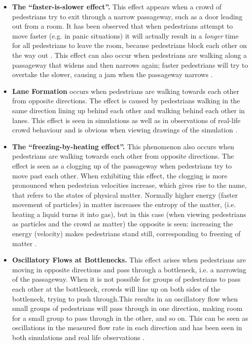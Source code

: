 \begin{itemize}
    \item \textbf{The ``faster-is-slower effect''.}  This effect appears when 
        a crowd of pedestrians try to exit through a narrow passageway, such 
        as a door leading out from a room. It has been observed that when 
        pedestrians attempt to move faster (e.g. in panic situations) it will 
        actually result in a \emph{longer} time for all pedestrians to leave 
        the room, because pedestrians block each other on the way out 
        \cite{helbing00}. This effect can also occur when pedestrians are 
        walking along a passageway that widens and then narrows again; faster 
        pedestrians will try to overtake the slower, causing a jam when the 
        passageway narrows \cite{self-org}.

    \item \textbf{Lane Formation} occurs when pedestrians are walking towards 
        each other from opposite directions. The effect is caused by 
        pedestrians walking in the same direction lining up behind each other 
        and walking behind each other in lanes. This effect is seen in 
        simulations as well as in observations of real-life crowd behaviour 
        and is obvious when viewing drawings of the simulation 
        \cite{self-org}.
        
    \item \textbf{The ``freezing-by-heating effect''.} This phenomenon also 
        occurs when pedestrians are walking towards each other from opposite 
        directions. The effect is seen as a clogging up of the passageway when 
        pedestrians try to move past each other. When exhibiting this effect, 
        the clogging is more pronounced when pedestrian velocities increase, 
        which gives rise to the name, that refers to the states of physical 
        matter. Normally higher energy (faster movement of particles) in 
        matter increases the entropy of the matter, (i.e.  heating a liquid 
        turns it into gas), but in this case (when viewing pedestrians as 
        particles and the crowd as matter) the opposite is seen: increasing 
        the energy (velocity) makes pedestrians stand still, corresponding to 
        freezing of matter \cite{frebyheat}.
        
    \item \textbf{Oscillatory Flows at Bottlenecks.}
        This effect arises when pedestrians are moving in opposite directions 
        and pass through a bottleneck, i.e. a narrowing of the passageway.  
        When it is not possible for groups of pedestrians to pass each other 
        at the bottleneck, crowds will line up on both sides of the 
        bottleneck, trying to push through.This results in an oscillatory flow 
        when small groups of pedestrians will pass through in one direction, 
        making room for a small group to pass through in the other, and so on.
        This can be seen as oscillations in the measured flow rate in each 
        direction and has been seen in both simulations and real life 
        observations \cite{self-org}.
\end{itemize}

